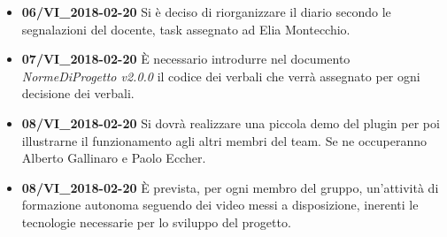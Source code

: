 \documentclass[a4paper, oneside, openany]{article}
\begin{document}
\begin{itemize}
\begin{itemize}
	
      \end{itemize}
  
   \item  \textbf{ 06/VI\_2018-02-20 } Si è deciso di riorganizzare il diario secondo le segnalazioni del docente, task assegnato ad Elia Montecchio.
   
    \item  \textbf{ 07/VI\_2018-02-20 } È necessario introdurre nel documento \emph{NormeDiProgetto v2.0.0} il codice dei verbali che verrà assegnato per ogni decisione dei verbali.
   
   \item  \textbf{ 08/VI\_2018-02-20 } Si dovrà realizzare una piccola demo del plugin per poi illustrarne il funzionamento agli altri membri del team. Se ne occuperanno Alberto Gallinaro e Paolo Eccher.
   
   \item  \textbf{ 08/VI\_2018-02-20 } È prevista, per ogni membro del gruppo, un'attività di formazione autonoma seguendo dei video messi a disposizione, inerenti le tecnologie necessarie per lo sviluppo del progetto.
   
   
    

    \end{itemize}
 

	
\end{document}
